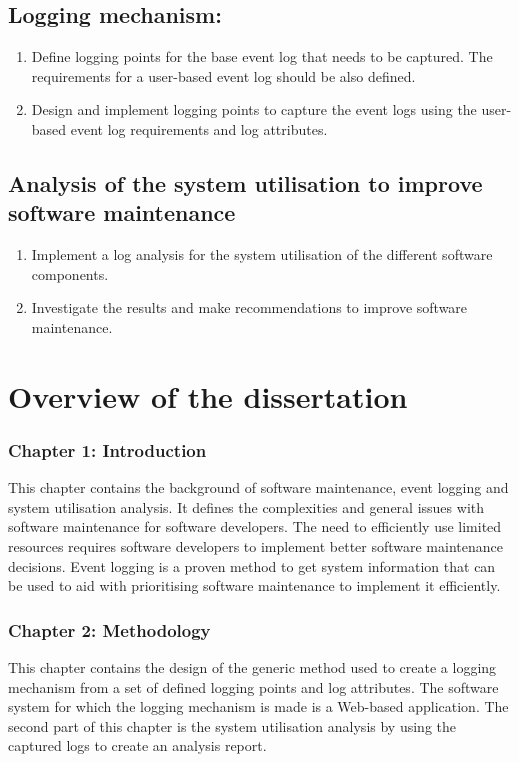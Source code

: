 \subsection{Logging mechanism:}\label{sec:ch1_osLogging}
\begin{enumerate}
	\item Define logging points for the base event log that needs to be captured. The requirements for a user-based event log should be also defined.
	\item Design and implement logging points to capture the event logs using the user-based event log requirements and log attributes.
\end{enumerate}

\subsection{Analysis of the system utilisation to improve software maintenance}\label{sec:ch1_osAnalysis}
\begin{enumerate}
	\item Implement a log analysis for the system utilisation of the different software components.
	\item Investigate the results and make recommendations to improve software maintenance.
\end{enumerate}

\section{Overview of the dissertation}
\subsubsection{Chapter 1: Introduction}
This chapter contains the background of software maintenance, event logging and system utilisation analysis. It defines the complexities and general issues with software maintenance for software developers. The need to efficiently use limited resources requires software developers to implement better software maintenance decisions. Event logging is a proven method to get system information that can be used to aid with prioritising software maintenance to implement it efficiently.

\subsubsection{Chapter 2: Methodology}
This chapter contains the design of the generic method used to create a logging mechanism from a set of defined logging points and log attributes. The software system for which the logging mechanism is made is a Web-based application. The second part of this chapter is the system utilisation analysis by using the captured logs to create an analysis report.

